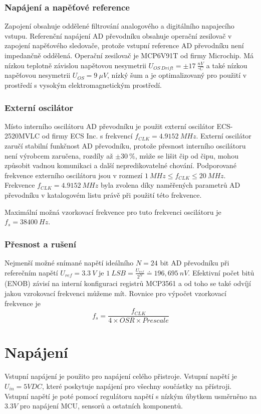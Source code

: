 \subsubsection{Napájení a napěťové reference}
Zapojení obsahuje oddělené filtrování analogového a digitálního napajecího vstupu.
Referenční napájení AD převodníku obsahuje operační zesilovač v zapojení napěťového sledovače, protože vstupní reference AD převodníku není impedančně oddělená. Operační zesilovač je MCP6V91T od firmy Microchip. Má nízkou teplotně závislou napětovou nesymetrii $U_{OS \ Drift} = \pm 17  \ \frac{nV}{^\circ C}$
a také nízkou napěťovou nesymetrii $U_{OS} = 9 \ \mu V$, nízký šum a je optimalizovaný pro použití v prostředí s vysokým elektromagnetickým prostředí.

\subsubsection{Externí oscilátor}
Místo interního oscilátoru AD převodníku je použit externí oscilátor ECS-2520MVLC od firmy ECS Inc. s frekvencí $f_{CLK} = 4.9152 \ MHz$. Externí oscilátor zaručí stabilní funkčnost AD převodníku, protože přesnost interního oscilátoru není výrobcem zaručena, rozdíly až $\pm 30  \ \%$, může se lišit čip od čipu, mohou způsobit vadnou komunikaci a další nepredikovatelné chování.
Podporované frekvence externího oscilátoru jsou v rozmezí $ 1 \ MHz \leq  f_{CLK} \leq 20 \ MHz $. Frekvence $f_{CLK} = 4.9152 \ MHz$ byla zvolena díky naměřených parametrů AD převodníku v katalogovém listu právě při použití této frekvence.
\par
Maximální možná vzorkovací frekvence pro tuto frekvenci oscilátoru je $f_s = 38400 \ Hz$.

\subsubsection{Přesnost a rušení}
Nejmenší možné snímané napětí ideálního $N = 24$ bit AD převodníku při referečním napětí $U_{ref} = 3.3 \ V $ je $ 1 \ LSB = \frac{U_{ref}}{2^{N}} \doteq  196,695  \ nV$.
Efektivní počet bitů (ENOB) závisí na interní konfiguraci registrů MCP3561 a od toho se také odvíjí jakou vzrokovací frekvenci můžeme mít. Rovnice pro výpočet vzorkovací frekvence je
\begin{equation}
    f_s = \frac{f_{CLK}}{4 \times OSR \times Prescale}
\end{equation}

\section{Napájení}
Vstupní napájení je použito pro napájení celého přistroje. Vstupní napětí je $U_{in} = 5V DC$, které poskytuje napájení pro všechny součástky na přístroji. Vstupní napětí je poté pomocí regulátoru napětí s nízkým úbytkem usměrněno na $3.3 V$ pro napájení MCU, sensorů a ostatních komponentů.

